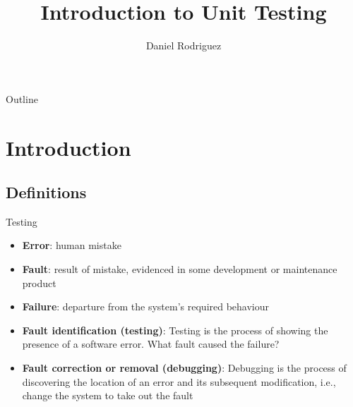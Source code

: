 \documentclass[11pt, xcolor=svgnames]{beamer}
\title {Introduction to Unit Testing}
\author[Daniel Rodriguez]{
  \textcolor{green!50!black}{Daniel Rodriguez}%
}
\institute[UAH]{University of Alcala}
\date{}
\providecommand{\alert}[1]{\textbf{#1}}
\begin{document}
\maketitle

\begin{frame}[fragile]{Outline}
  \tableofcontents
\end{frame}

\AtBeginSection
{
\begin{frame}
  \tableofcontents[currentsection]
\end{frame}
}


\section{Introduction}


\subsection{Definitions}


\begin{frame}{Testing}

\begin{itemize}
 \item \alert{Error}: human mistake
 \item \alert{Fault}: result of mistake, evidenced in some development or maintenance product
 \item \alert{Failure}:  departure from the system's required behaviour
\end{itemize}

\begin{itemize}
 \item \alert{Fault identification (testing)}: Testing is the process of showing the presence of a software error. What fault caused the failure?
 \item \alert{Fault correction or removal (debugging)}: Debugging is the process of discovering the location of an error and its subsequent modification, i.e., change the system to take out the fault
\end{itemize}


\end{frame}
\end{document}
